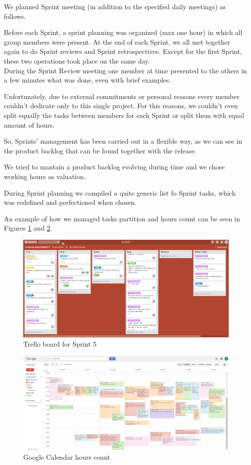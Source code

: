 \documentclass[a4paper,12pt]{report}
\begin{document}
We planned Sprint meeting (in addition to the specified daily meetings) as follows.

Before each Sprint, a sprint planning was organized (max one hour) in which all group members were present. At the end of each Sprint, we all met together again to do Sprint reviews and Sprint retrospectives. Except for the first Sprint, these two operations took place on the same day.\\
During the Sprint Review meeting one member at time presented to the others in a few minutes what was done, even with brief examples.

Unfortunately, due to external commitments or personal reasons every member couldn't dedicate only to this single project. For this reasons, we couldn't even split equally the tasks between members for each Sprint or split them with equal amount of hours.

So, Sprints' management has been carried out in a flexible way, 
as we can see in the product backlog that can be found together with the release. 

We tried to mantain a product backlog evolving during time and we chose working hours as valuation.

During Sprint planning we compiled a quite generic list fo Sprint tasks, which was redefined and perfectioned when chosen.

An example of how we managed tasks partition and hours count can be seen in Figures \ref{fig:Trello} and \ref{fig:Calendar}.

\begin{figure}[ht]
\centering
\includegraphics[width=\textwidth]{figures/Trello.png}
\caption{Trello board for Sprint 5}
\label{fig:Trello}
\end{figure}

\begin{figure}[ht]
\centering
\includegraphics[width=\textwidth]{figures/Calendar.png}
\caption{Google Calendar hours count}
\label{fig:Calendar}
\end{figure}
\end{document}
